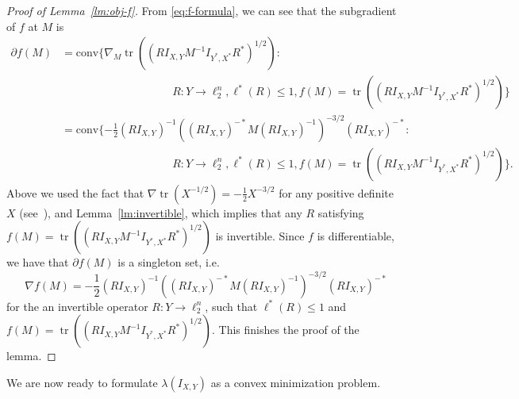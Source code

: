 \documentclass{article}
\DeclareMathOperator{\tr}{tr}
\begin{document}
\begin{proof}[Proof of Lemma~\ref{lm:obj-f}]
  From \eqref{eq:f-formula}, we can see that the subgradient of
  $f$ at $M$ is
  \begin{align*}
  \partial f(M) &= \mathrm{conv}
  \{\nabla_M \tr((RI_{X,Y}M^{-1}I_{Y^*,X^*}R^*)^{1/2}):\\
  &\hspace{10em}
  R: Y \to \ell_2^n, \ell^*(R) \le 1,
  f(M) = \tr((RI_{X,Y}M^{-1}I_{Y^*,X^*}R^*)^{1/2})\}\\
  &= 
  \mathrm{conv}\{
  -\frac{1}{2} 
  (RI_{X,Y})^{-1} ((RI_{X,Y})^{-*} M (RI_{X,Y})^{-1})^{-3/2} (RI_{X,Y})^{-*}:\\ 
  &\hspace{10em}
  R: Y \to \ell_2^n, \ell^*(R) \le 1, 
  f(M) = \tr((RI_{X,Y}M^{-1}I_{Y^*,X^*}R^*)^{1/2})\}.
  \end{align*}
  Above we used the fact that $\nabla \tr(X^{-1/2}) =
  -\frac{1}{2}X^{-3/2}$ for any positive definite $X$
  (see~\cite{Lewis95}), and Lemma~\ref{lm:invertible}, which implies
  that any $R$ satisfying $f(M) =
  \tr((RI_{X,Y}M^{-1}I_{Y^*,X^*}R^*)^{1/2})$ is invertible. Since $f$
  is differentiable, we have that $\partial f(M)$ is a singleton set,
  i.e.~
  \[
  \nabla f(M) = 
  -\frac{1}{2} (RI_{X,Y})^{-1} ((RI_{X,Y})^{-*} M (RI_{X,Y})^{-1})^{-3/2} (RI_{X,Y})^{-*}
  \]
  for the an invertible operator $R: Y \to \ell_2^n$, such that
  $\ell^*(R) \le 1$ and $f(M) =
  \tr((RI_{X,Y}M^{-1}I_{Y^*,X^*}R^*)^{1/2})$. This finishes the proof
  of the lemma.
\end{proof}

We are now ready to formulate $\lambda(I_{X,Y})$ as a convex
minimization problem. 
\end{document}
